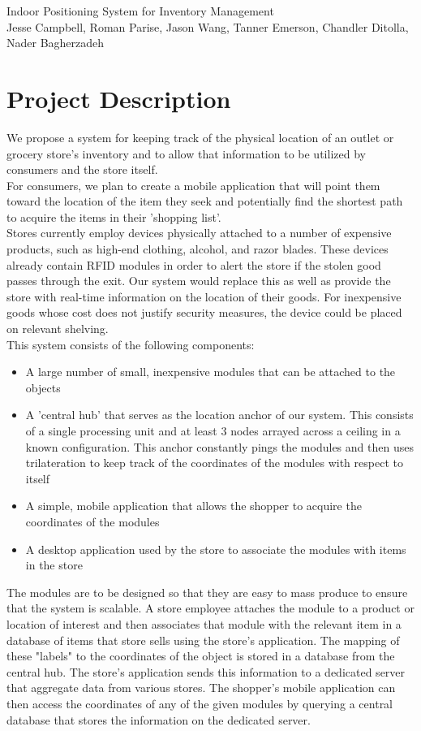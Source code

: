 \documentclass{article}
\begin{document}
\begin{center}
{\Large Indoor Positioning System for Inventory Management} \\
{\small Jesse Campbell, Roman Parise, Jason Wang, Tanner Emerson, Chandler Ditolla, Nader Bagherzadeh}
\end{center}
\section{Project Description}
We propose a system for keeping track of the physical location of an outlet or grocery store's inventory and to allow that information to be utilized by consumers and the store itself. \\

For consumers, we plan to create a mobile application that will point them toward the location of the item they seek and potentially find the shortest path to acquire the items in their 'shopping list'. \\

Stores currently employ devices physically attached to a number of expensive products, such as high-end clothing, alcohol, and razor blades. These devices already contain RFID modules in order to alert the store if the stolen good passes through the exit. Our system would replace this as well as provide the store with real-time information on the location of their goods. For inexpensive goods whose cost does not justify security measures, the device could be placed on relevant shelving.\\

This system consists of the following components:
\begin{itemize}
\item A large number of small, inexpensive modules that can be attached to the objects
\item A 'central hub' that serves as the location anchor of our system. This consists of a single processing unit and at least $3$ nodes arrayed across a ceiling in a known configuration. This anchor constantly pings the modules and then uses trilateration to keep track of the coordinates of the modules with respect to itself
\item A simple, mobile application that allows the shopper to acquire the coordinates of the modules
\item A desktop application used by the store to associate the modules with items in the store
\end{itemize}
The modules are to be designed so that they are easy to mass produce to ensure that the system is scalable.
A store employee attaches the module to a product or location of interest and then associates that module with the relevant item in a database of items that store sells using the store's application.
The mapping of these "labels" to the coordinates of the object is stored in a database from the central hub.
The store's application sends this information to a dedicated server that aggregate data from various stores.
The shopper's mobile application can then access the coordinates of any of the given modules by querying a central database that stores the information on the dedicated server.
\end{document}
